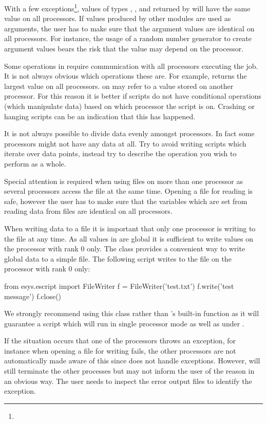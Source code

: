With a few exceptions\footnote{}, values of
types , ,  and \numpy returned by \escript will
have the same value on all processors.
If values produced by other modules are used as arguments, the user has to
make sure that the argument values are identical on all processors.
For instance, the usage of a random number generator to create argument values
bears the risk that the value may depend on the processor. 

Some operations in \escript require communication with all processors
executing the job. It is not always obvious which operations these are.
For example,  returns the largest value on all processors.
 on  may refer to a value stored on another processor.
For this reason it is better if scripts do not have conditional operations
(which manipulate data) based on which processor the script is on.
Crashing or hanging scripts can be an indication that this has happened.

It is not always possible to divide data evenly amongst processors.
In fact some processors might not have any data at all.
Try to avoid writing scripts which iterate over data points, instead try to
describe the operation you wish to perform as a whole.

Special attention is required when using files on more than one processor as
several processors access the file at the same time. Opening a file for
reading is safe, however the user has to make sure that the variables which
are set from reading data from files are identical on all processors.

When writing data to a file it is important that only one processor is writing
to the file at any time. As all values in \escript are global it is sufficient
to write values on the processor with \MPI rank $0$ only.
The  class provides a convenient way to write global data
to a simple file.  The following script writes to the file  on
the processor with rank 0 only:
\begin{python}
  from esys.escript import FileWriter
  f = FileWriter('test.txt')
  f.write('test message')
  f.close()
\end{python}
We strongly recommend using this class rather than \PYTHON's built-in 
function as it will guarantee a script which will run in single processor mode
as well as under \MPI.

If the situation occurs that one of the processors throws an exception, for
instance when opening a file for writing fails, the other processors are not
automatically made aware of this since \MPI does not handle exceptions.
However, \MPI will still terminate the other processes but may not inform the
user of the reason in an obvious way.
The user needs to inspect the error output files to identify the exception.
